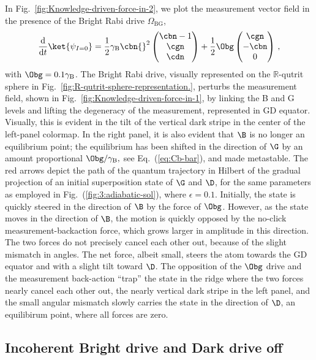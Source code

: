 In Fig.~\ref{fig:Knowledge-driven-force-in-2}, we plot the measurement
vector field in the presence of the Bright Rabi drive $\Omega_{\mathrm{BG}}$,
\begin{equation}
\frac{\mathrm{d}}{\mathrm{d}t}\ket{\psi_{I=0}}=\frac{1}{2}\gamma_{{\rm B}}\cbn{}^{2}\begin{pmatrix}\cbn-1\\
\cgn\\
\cdn
\end{pmatrix}+\frac{1}{2}\Obg\begin{pmatrix}\cgn\\
-\cbn\\
0
\end{pmatrix}\,,\label{eq:ddtPsiI-vec-1}
\end{equation}
with $\Obg=0.1\gamma_{{\rm B}}$. The Bright Rabi drive, visually
represented on the $\mathbb{R}$-qutrit sphere in Fig.~\ref{fig:R-qutrit-sphere-representation.},
perturbs the measurement field, shown in Fig.~\ref{fig:Knowledge-driven-force-in-1},
by linking the B and G levels and lifting the degeneracy of the measurement,
represented in GD equator. Visually, this is evident in the tilt of
the vertical dark stripe in the center of the left-panel colormap.
In the right panel, it is also evident that $\B$ is no longer an
equilibrium point; the equilibrium has been shifted in the direction
of $\G$ by an amount proportional $\Obg/\gamma_{{\rm B}},$ see Eq.~(\ref{eq:Cb-bar}),
and made metastable. The red arrows depict the path of the quantum
trajectory in Hilbert of the gradual projection of an initial superposition
state of $\G$ and $\D$, for the same parameters as employed in Fig.~(\ref{fig:3:adiabatic-sol}),
where $\epsilon=0.1$. Initially, the state is quickly steered in
the direction of $\B$ by the force of $\Obg$. However, as the state
moves in the direction of $\B$, the motion is quickly opposed by
the no-click measurement-backaction force, which grows larger in amplitude
in this direction. The two forces do not precisely cancel each other
out, because of the slight mismatch in angles. The net force, albeit
small, steers the atom towards the GD equator and with a slight tilt
toward $\D$. The opposition of the $\Obg$ drive and the measurement
back-action ``trap'' the state in the ridge where the two forces
nearly cancel each other out, the nearly vertical dark stripe in the
left panel, and the small angular mismatch slowly carries the state
in the direction of $\D$, an equilibirum point, where all forces
are zero.


\subsection{Incoherent Bright drive and Dark drive off\label{subsec:Incoherent-Bright-drive}}

